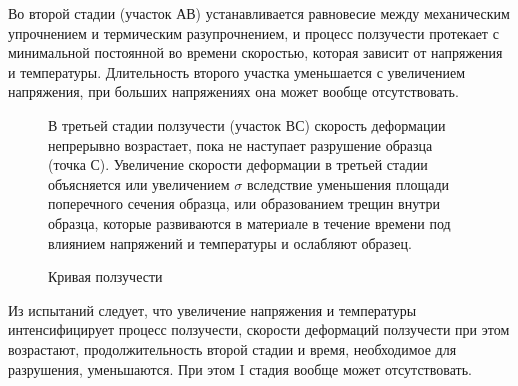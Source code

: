 Во второй стадии (участок АВ) устанавливается равновесие между механическим 
упрочнением и термическим разупрочнением, и процесс ползучести протекает с 	минимальной 
постоянной во времени скоростью, которая зависит от напряжения и 
температуры. Длительность второго участка уменьшается с увеличением напряжения, при 
больших напряжениях она может вообще отсутствовать.			
\newpage
	\begin{figure}[h!]
		\begin{minipage}[h]{0.48\linewidth}
			\caption{Кривая ползучести} 
		\end{minipage}
		\hfill
		\begin{minipage}[h]{0.48\linewidth}

		В третьей стадии ползучести (участок ВС) скорость деформации непрерывно возрастает, пока 
не наступает разрушение образца (точка С).
Увеличение скорости деформации в третьей стадии объясняется или увеличением $\sigma$ 
вследствие уменьшения площади поперечного сечения образца, или образованием трещин внутри 
образца, которые развиваются в материале в течение времени под влиянием напряжений и 
температуры и ослабляют образец.
		\end{minipage}
		\label{intro_creep}
	\end{figure}
Из испытаний следует, что увеличение напряжения и температуры интенсифицирует процесс 
ползучести, скорости деформаций ползучести при этом возрастают, продолжительность второй 
стадии и время, необходимое для разрушения, уменьшаются. При этом I стадия вообще может 
отсутствовать.


